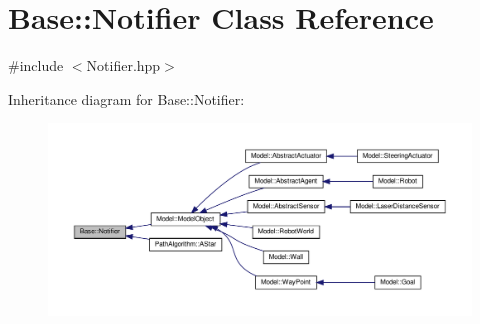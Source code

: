 \hypertarget{class_base_1_1_notifier}{}\section{Base\+:\+:Notifier Class Reference}
\label{class_base_1_1_notifier}


{\ttfamily \#include $<$Notifier.\+hpp$>$}



Inheritance diagram for Base\+:\+:Notifier\+:
\nopagebreak
\begin{figure}[H]
\begin{center}
\leavevmode
\includegraphics[width=350pt]{class_base_1_1_notifier__inherit__graph}
\end{center}
\end{figure}
